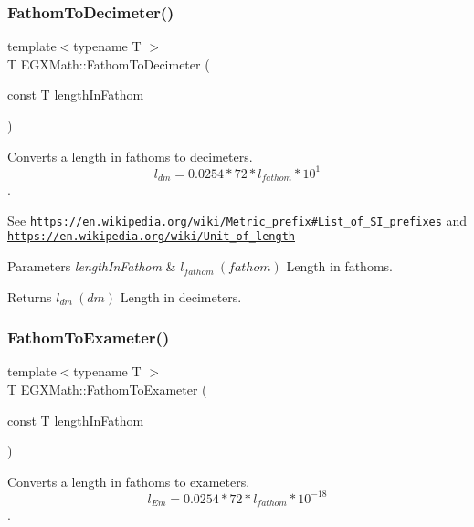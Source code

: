 \subsubsection{\texorpdfstring{Fathom\+To\+Decimeter()}{FathomToDecimeter()}}
{\footnotesize\ttfamily template$<$typename T $>$ \\
T E\+G\+X\+Math\+::\+Fathom\+To\+Decimeter (\begin{DoxyParamCaption}\item[{const T}]{length\+In\+Fathom }\end{DoxyParamCaption})}



Converts a length in fathoms to decimeters. \[ l_{dm}=0.0254 * 72 * l_{fathom} * 10^{1} \]. 

See \href{https://en.wikipedia.org/wiki/Metric_prefix#List_of_SI_prefixes}{\tt https\+://en.\+wikipedia.\+org/wiki/\+Metric\+\_\+prefix\#\+List\+\_\+of\+\_\+\+S\+I\+\_\+prefixes} and \href{https://en.wikipedia.org/wiki/Unit_of_length}{\tt https\+://en.\+wikipedia.\+org/wiki/\+Unit\+\_\+of\+\_\+length} 
\begin{DoxyParams}{Parameters}
{\em length\+In\+Fathom} & $ l_{fathom}\ (fathom)$ Length in fathoms. \\
\hline
\end{DoxyParams}
\begin{DoxyReturn}{Returns}
$ l_{dm}\ (dm)$ Length in decimeters. 
\end{DoxyReturn}
\mbox{\label{group___e_g_x_math-_conversions-_length_conversions-_imperial-_fathom-_s_i_gaf1d241e8c22ec6118c78924886dcd977}} 
\subsubsection{\texorpdfstring{Fathom\+To\+Exameter()}{FathomToExameter()}}
{\footnotesize\ttfamily template$<$typename T $>$ \\
T E\+G\+X\+Math\+::\+Fathom\+To\+Exameter (\begin{DoxyParamCaption}\item[{const T}]{length\+In\+Fathom }\end{DoxyParamCaption})}



Converts a length in fathoms to exameters. \[ l_{Em}=0.0254 * 72 * l_{fathom} * 10^{-18} \]. 

